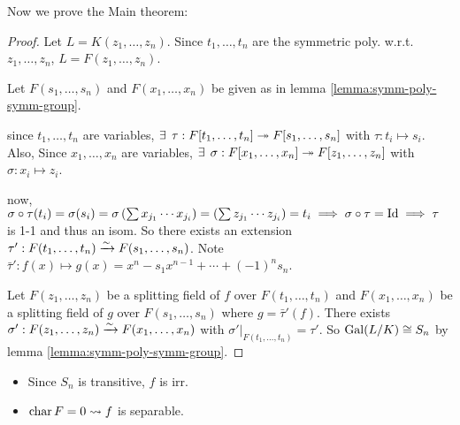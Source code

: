 Now we prove the Main theorem:
\begin{proof}
  Let $L = K(z_1, \dots, z_n)$. Since $t_1, \dots, t_n$ are the symmetric
  poly. w.r.t. $z_1, \dots, z_n$, $L = F(z_1, \dots, z_n)$.

  Let $F(s_1, \dots, s_n)$ and $F(x_1, \dots, x_n)$ be given as in lemma
  \ref{lemma:symm-poly-symm-group}.

  since $t_1, \dots, t_n$ are variables,
  $\exists\: \tau: F[t_1, \dots, t_n] \onto F[s_1, \dots, s_n]$ with $\tau:
  t_i \mapsto s_i$.
  Also, Since $x_1, \dots, x_n$ are variables, $\exists\: \sigma:
  F[x_1, \dots, x_n] \onto F[z_1, \dots, z_n]$ with $\sigma: x_i \mapsto z_i$.

  now, $\sigma \circ \tau(t_i) = \sigma(s_i)
  = \sigma\left(\sum x_{j_1}\cdots x_{j_i}\right)
  = \left(\sum z_{j_1}\cdots z_{j_i}\right) = t_i \implies \sigma\circ\tau =
  {\rm Id} \implies \tau$ is 1-1 and thus an isom.
  So there exists an extension $\tau': F(t_1, \dots, t_n) \xrightarrow{\sim} F(s_1, \dots, s_n)$.
  Note $\bar{\tau}': f(x) \mapsto g(x) = x^n - s_1x^{n-1} + \cdots + (-1)^ns_n$.

  Let $F(z_1, \dots, z_n)$ be a splitting field of $f$ over $F(t_1, \dots, t_n)$
  and $F(x_1, \dots, x_n)$ be a splitting field of $g$ over $F(s_1, \dots, s_n)$
  where $g = \bar{\tau}'(f)$.
  There exists $\sigma': F(z_1, \dots, z_n) \xrightarrow{\sim} F(x_1, \dots, x_n)$ with
  $\sigma'\big|_{F(t_1, \dots, t_n)} = \tau'$.
  So $\operatorname{Gal}(L/K) \cong S_n$ by lemma \ref{lemma:symm-poly-symm-group}.
\end{proof}

\begin{remark} \mbox{}
  \begin{itemize}
    \item Since $S_n$ is transitive, $f$ is irr.
    \item $\operatorname{char} F = 0 \leadsto f$ is separable.
  \end{itemize}
\end{remark}
